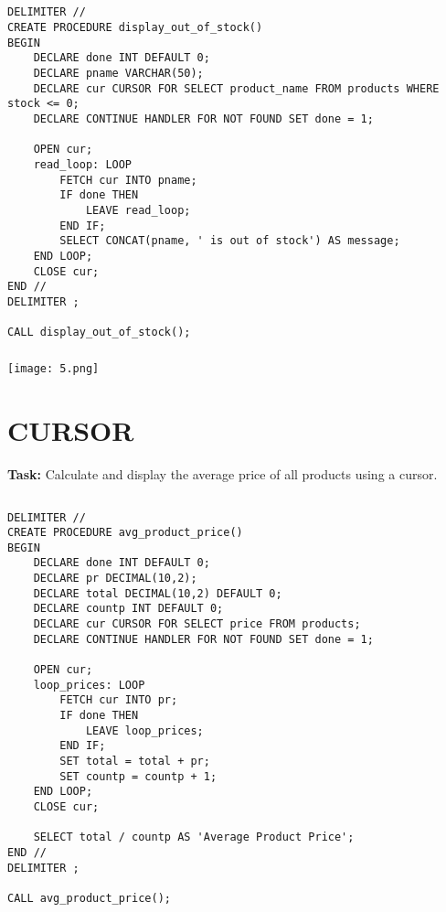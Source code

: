 \documentclass[12pt,a4paper]{article}
\begin{document}
\subsection{}
\begin{lstlisting}
DELIMITER //
CREATE PROCEDURE display_out_of_stock()
BEGIN
    DECLARE done INT DEFAULT 0;
    DECLARE pname VARCHAR(50);
    DECLARE cur CURSOR FOR SELECT product_name FROM products WHERE stock <= 0;
    DECLARE CONTINUE HANDLER FOR NOT FOUND SET done = 1;

    OPEN cur;
    read_loop: LOOP
        FETCH cur INTO pname;
        IF done THEN
            LEAVE read_loop;
        END IF;
        SELECT CONCAT(pname, ' is out of stock') AS message;
    END LOOP;
    CLOSE cur;
END //
DELIMITER ;

CALL display_out_of_stock();

\end{lstlisting}

\subsubsection{}
\begin{center}
    \texttt{[image: 5.png]}
\end{center}


\section{CURSOR}
\textbf{Task:} Calculate and display the average price of all products using a cursor.

\subsection{}
\begin{lstlisting}
DELIMITER //
CREATE PROCEDURE avg_product_price()
BEGIN
    DECLARE done INT DEFAULT 0;
    DECLARE pr DECIMAL(10,2);
    DECLARE total DECIMAL(10,2) DEFAULT 0;
    DECLARE countp INT DEFAULT 0;
    DECLARE cur CURSOR FOR SELECT price FROM products;
    DECLARE CONTINUE HANDLER FOR NOT FOUND SET done = 1;

    OPEN cur;
    loop_prices: LOOP
        FETCH cur INTO pr;
        IF done THEN
            LEAVE loop_prices;
        END IF;
        SET total = total + pr;
        SET countp = countp + 1;
    END LOOP;
    CLOSE cur;

    SELECT total / countp AS 'Average Product Price';
END //
DELIMITER ;

CALL avg_product_price();

\end{lstlisting}
\end{document}

